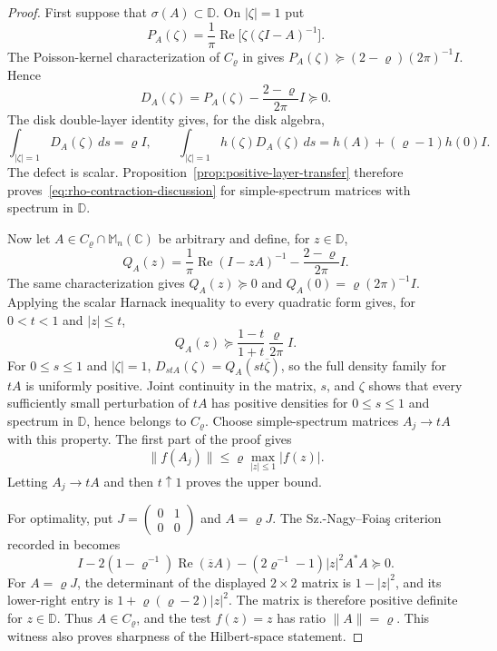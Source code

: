 \documentclass[preprints,article,submit,oneauthor]{Definitions/mdpi}
\theoremstyle{mdpi}
\theoremstyle{definition}
\newcommand{\C}{\mathbb C}
\newcommand{\D}{\mathbb D}
\newcommand{\Mn}{\mathbb M_n(\C)}
\newcommand{\RePart}{\operatorname{Re}}
\begin{document}
\begin{proof}
First suppose that $\sigma(A)\subset\D$.  On $\lvert\zeta\rvert=1$
put
\[
  P_A(\zeta)=\frac1\pi\RePart\bigl[
  \zeta(\zeta I-A)^{-1}\bigr].
\]
The Poisson-kernel characterization of $C_\varrho$ in
\cite{SchwenningerDeVriesRho2025} gives
$P_A(\zeta)\succeq(2-\varrho)(2\pi)^{-1}I$.  Hence
\[
  D_A(\zeta)=P_A(\zeta)-\frac{2-\varrho}{2\pi}I\succeq0.
\]
The disk double-layer identity gives, for the disk algebra,
\begin{equation}
  \int_{\lvert\zeta\rvert=1}D_A(\zeta)\,ds=\varrho I,
  \qquad
  \int_{\lvert\zeta\rvert=1}h(\zeta)D_A(\zeta)\,ds
  =h(A)+(\varrho-1)h(0)I.
  \label{eq:rho-positive-layer}
\end{equation}
The defect is scalar.  Proposition~\ref{prop:positive-layer-transfer}
therefore proves~\eqref{eq:rho-contraction-discussion} for
simple-spectrum matrices with spectrum in $\D$.

Now let $A\in C_\varrho\cap\Mn$ be arbitrary and define, for $z\in\D$,
\[
  Q_A(z)=\frac1\pi\RePart(I-zA)^{-1}
  -\frac{2-\varrho}{2\pi}I.
\]
The same characterization gives $Q_A(z)\succeq0$ and
$Q_A(0)=\varrho(2\pi)^{-1}I$.  Applying the scalar Harnack inequality
to every quadratic form gives, for $0<t<1$ and $\lvert z\rvert\leq t$,
\[
  Q_A(z)\succeq
  \frac{1-t}{1+t}\frac{\varrho}{2\pi}I.
\]
For $0\leq s\leq1$ and $\lvert\zeta\rvert=1$,
$D_{stA}(\zeta)=Q_A(st\overline\zeta)$, so the full density family for
$tA$ is uniformly positive.  Joint continuity in the matrix, $s$, and
$\zeta$ shows that every sufficiently small perturbation of $tA$ has
positive densities for $0\leq s\leq1$ and spectrum in $\D$, hence
belongs to $C_\varrho$.  Choose simple-spectrum matrices $A_j\to tA$
with this property.  The first part of the proof gives
\[
  \lVert f(A_j)\rVert\leq\varrho
  \max_{\lvert z\rvert\leq1}\lvert f(z)\rvert.
\]
Letting $A_j\to tA$ and then $t\uparrow1$ proves the upper bound.

For optimality, put
$J=\left(\begin{smallmatrix}0&1\\0&0\end{smallmatrix}\right)$ and
$A=\varrho J$.  The Sz.-Nagy--Foia\c{s} criterion recorded in
\cite{SchwenningerDeVriesRho2025} becomes
\[
 I-2(1-\varrho^{-1})\RePart(\overline zA)
 -(2\varrho^{-1}-1)\lvert z\rvert^2A^*A\succeq0.
\]
For $A=\varrho J$, the determinant of the displayed $2\times2$
matrix is $1-\lvert z\rvert^2$, and its lower-right entry is
$1+\varrho(\varrho-2)\lvert z\rvert^2$.  The matrix is therefore
positive definite for $z\in\D$.  Thus $A\in C_\varrho$, and the test
$f(z)=z$ has ratio
$\lVert A\rVert=\varrho$.  This witness also proves sharpness of the
Hilbert-space statement.
\end{proof}
\end{document}
